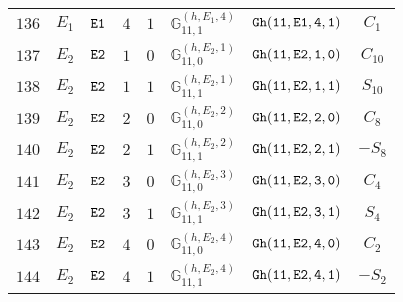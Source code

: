 \documentclass[fleqn,8pt]{jsarticle}
\begin{document}
\begin{table}[ht!]
\begin{center}
\begin{tabular}{cccccccc}
$ 136 $ & $ E_{1} $ & $ {\tt E1} $ & $ 4 $ & $ 1 $ & $ \mathbb{G}_{11,1}^{(h,E_{1},4)} $ & $ {\tt Gh(11,E1,4,1)} $ & $ C_{1} $ \\
$ 137 $ & $ E_{2} $ & $ {\tt E2} $ & $ 1 $ & $ 0 $ & $ \mathbb{G}_{11,0}^{(h,E_{2},1)} $ & $ {\tt Gh(11,E2,1,0)} $ & $ C_{10} $ \\
$ 138 $ & $ E_{2} $ & $ {\tt E2} $ & $ 1 $ & $ 1 $ & $ \mathbb{G}_{11,1}^{(h,E_{2},1)} $ & $ {\tt Gh(11,E2,1,1)} $ & $ S_{10} $ \\
$ 139 $ & $ E_{2} $ & $ {\tt E2} $ & $ 2 $ & $ 0 $ & $ \mathbb{G}_{11,0}^{(h,E_{2},2)} $ & $ {\tt Gh(11,E2,2,0)} $ & $ C_{8} $ \\
$ 140 $ & $ E_{2} $ & $ {\tt E2} $ & $ 2 $ & $ 1 $ & $ \mathbb{G}_{11,1}^{(h,E_{2},2)} $ & $ {\tt Gh(11,E2,2,1)} $ & $ - S_{8} $ \\
$ 141 $ & $ E_{2} $ & $ {\tt E2} $ & $ 3 $ & $ 0 $ & $ \mathbb{G}_{11,0}^{(h,E_{2},3)} $ & $ {\tt Gh(11,E2,3,0)} $ & $ C_{4} $ \\
$ 142 $ & $ E_{2} $ & $ {\tt E2} $ & $ 3 $ & $ 1 $ & $ \mathbb{G}_{11,1}^{(h,E_{2},3)} $ & $ {\tt Gh(11,E2,3,1)} $ & $ S_{4} $ \\
$ 143 $ & $ E_{2} $ & $ {\tt E2} $ & $ 4 $ & $ 0 $ & $ \mathbb{G}_{11,0}^{(h,E_{2},4)} $ & $ {\tt Gh(11,E2,4,0)} $ & $ C_{2} $ \\
$ 144 $ & $ E_{2} $ & $ {\tt E2} $ & $ 4 $ & $ 1 $ & $ \mathbb{G}_{11,1}^{(h,E_{2},4)} $ & $ {\tt Gh(11,E2,4,1)} $ & $ - S_{2} $ \\
 \hline \hline
\end{tabular}
\end{center}
\end{table}
\end{document}
